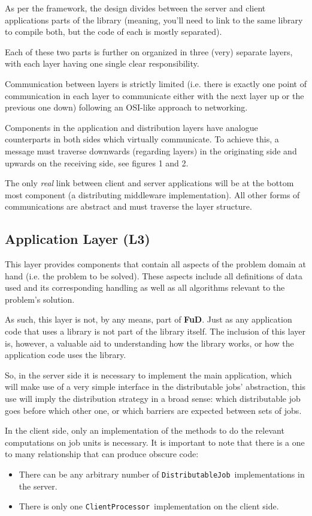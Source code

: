 \documentclass[a4paper,12pt,english]{report}
\newcommand{\fud}{\textbf{FuD}}
\renewcommand{\DJ}{\texttt{DistributableJob}}
\newcommand{\CP}{\texttt{ClientProcessor}}
\begin{document}
As per the framework, the design divides between the server and client applications parts of the library (meaning, you'll need to link to the same library to compile both, but the code of each is mostly separated). 

Each of these two parts is further on organized in three (very) separate layers, with each layer having one single clear responsibility. 

Communication between layers is strictly limited (i.e. there is exactly one point of communication in each layer to communicate either with the next layer up or the previous one down) following an OSI-like approach to networking. 

Components in the application and distribution layers have analogue counterparts in both sides which virtually communicate. To achieve this, a message must traverse downwards (regarding layers) in the originating side and upwards on the receiving side, see figures 1 and 2.

The only \emph{real} link between client and server applications will be at the bottom most component (a distributing middleware implementation). All other forms of communications are abstract and must traverse the layer structure.

\subsection{Application Layer (L3)}
  
This layer provides components that contain all aspects of the problem domain at hand (i.e. the problem to be solved). These aspects include all definitions of data used and its corresponding handling as well as all algorithms relevant to the problem's solution. 

As such, this layer is not, by any means, part of \fud. Just as any application code that uses a library is not part of the library itself. The inclusion of this layer is, however, a valuable aid to understanding how the library works, or how the application code uses the library.

So, in the server side it is necessary to implement the main application, which will make use of a very simple interface in the distributable jobs' abstraction, this use will imply the distribution strategy in a broad sense: which distributable job goes before which other one, or which barriers are expected between sets of jobs.

In the client side, only an implementation of the methods to do the relevant computations on job units is necessary. It is important to note that there is a one to many relationship that can produce obscure code: 
\begin{itemize}
\item There can be any arbitrary number of \DJ \ implementations in the server.
\item There is only one \CP \ implementation on the client side.
\end{itemize}
\end{document}
